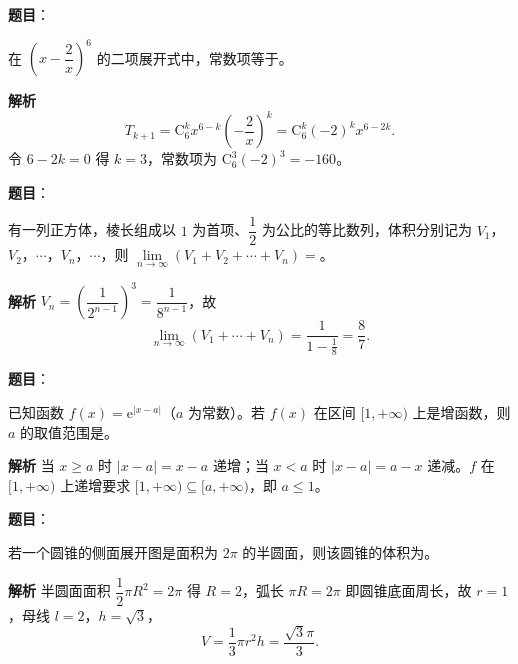 \begin{answer}

\textbf{题目}：

在 $\left(x-\dfrac2x\right)^6$ 的二项展开式中，常数项等于\gkblank{}。

\textbf{解析}
\nopagebreak[4]
\[T_{k+1}=\mathrm C_6^kx^{6-k}\left(-\frac2x\right)^k=\mathrm C_6^k(-2)^kx^{6-2k}.\]
令 $6-2k=0$ 得 $k=3$，常数项为 $\mathrm C_6^3(-2)^3=-160$。


\end{answer}
\begin{answer}

\textbf{题目}：

有一列正方体，棱长组成以 $1$ 为首项、$\dfrac12$ 为公比的等比数列，体积分别记为 $V_1$，$V_2$，$\cdots$，$V_n$，$\cdots$，则 $\lim\limits_{n\to\infty}(V_1+V_2+\cdots+V_n)=$\gkblank{}。

\textbf{解析}
$V_n=\left(\dfrac1{2^{n-1}}\right)^3=\dfrac1{8^{n-1}}$，故
\nopagebreak[4]
\[\lim_{n\to\infty}(V_1+\cdots+V_n)=\frac1{1-\frac18}=\frac87.\]


\end{answer}
\begin{answer}

\textbf{题目}：

已知函数 $f(x)=\mathrm e^{|x-a|}$（$a$ 为常数）。若 $f(x)$ 在区间 $[1,+\infty)$ 上是增函数，则 $a$ 的取值范围是\gkblank{}。

\textbf{解析}
当 $x\geqslant a$ 时 $|x-a|=x-a$ 递增；当 $x<a$ 时 $|x-a|=a-x$ 递减。$f$ 在 $[1,+\infty)$ 上递增要求 $[1,+\infty)\subseteq[a,+\infty)$，即 $a\leqslant1$。

\gkanswer{答案：$(-\infty,1]$。}

\end{answer}
\begin{answer}

\textbf{题目}：

若一个圆锥的侧面展开图是面积为 $2\pi$ 的半圆面，则该圆锥的体积为\gkblank{}。

\textbf{解析}
半圆面面积 $\dfrac12\pi R^2=2\pi$ 得 $R=2$，弧长 $\pi R=2\pi$ 即圆锥底面周长，故 $r=1$，母线 $l=2$，$h=\sqrt3$，
\nopagebreak[4]
\[V=\frac13\pi r^2h=\frac{\sqrt3\pi}3.\]


\end{answer}
